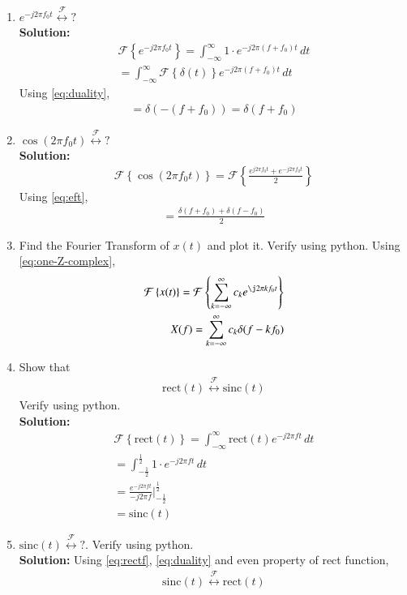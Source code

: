\documentclass[journal,12pt,twocolumn]{IEEEtran}
\newcommand{\solution}{\noindent \textbf{Solution: }}
\providecommand{\brak}[1]{\ensuremath{\left(#1\right)}}
\providecommand{\rect}[1]{\text{rect}\ensuremath{\left(#1\right)}}
\providecommand{\cbrak}[1]{\ensuremath{\left\{#1\right\}}}
\providecommand{\foutranin}[1]{\mathcal{F}\cbrak{#1}}
\providecommand{\foutranfin}[1]{\int_{-\infty}^{\infty}{#1}e^{-j2\pi ft}\,dt}
\providecommand{\sinc}[1]{\text{sinc}\ensuremath{\left(#1\right)}}
\providecommand{\system}[1]{\overset{\mathcal{#1}}{ \longleftrightarrow}}
\numberwithin{equation}{section}
\renewcommand\thesection{\arabic{section}}
\begin{document}
\begin{enumerate}[label=\thesection.\arabic*
,ref=\thesection.\theenumi]
\begin{align}
 \end{align}
 Since $e^{-j2\pi ft}=1$ for t=0 and remaining integrand is zero for t $\neq0$.
 \begin{align}
  =\int_{-\infty}^{\infty}\delta(t)\,dt\\
  =1
 \end{align}
 \item $e^{-j2\pi f_0t}\system{F}?$\\
 \solution 
 \begin{align}
 \foutranin{e^{-j2\pi f_0t}}=\int_{-\infty}^{\infty}1\cdot e^{-j2\pi\brak{f+f_0}t}\,dt\\
 =\int_{-\infty}^{\infty}\foutranin{\delta(t)} e^{-j2\pi\brak{f+f_0}t}\,dt
 \end{align}
 Using \eqref{eq:duality},
 \begin{align}
 \label{eq:eft}
 =\delta(-(f+f_0))=\delta(f+f_0)
 \end{align}
 \item $\cos(2\pi f_0t)\system{F}?$\\
 \solution
 \begin{align}
 \foutranin{\cos(2\pi f_0t)}=\foutranin{\frac{{e^{j2\pi f_0t}+e^{-j2\pi f_0t}}}{2}}
 \end{align}
 Using \eqref{eq:eft},
 \begin{align}
 =\frac{\delta(f+f_0)+\delta(f-f_0)}{2}
 \end{align}
 \item Find the Fourier Transform of $x(t)$ and plot it.  Verify using python.
 Using \eqref{eq:one-Z-complex},
 \begin{align}
 \foutranin{x(t)}=\foutranin{\sum_{k = -\infty}^{\infty}c_ke^{\j2\pi kf_0 t}}\\
 X(f)=\sum_{k = -\infty}^{\infty}c_k\delta(f-kf_0)
 \end{align}
 \item Show that 
 \begin{align}
	 \rect{t} \system{F} \sinc{t}
 \end{align}
 Verify using python.\\
 \solution 
 \begin{align}
 \foutranin{\rect{t}}=\foutranfin{\rect{t}}\\
 =\int_{-\frac{1}{2}}^{\frac{1}{2}}1\cdot e^{-j2\pi ft}\,dt\\
 =\frac{e^{-j2\pi ft}}{-j2\pi f}\Big |_{-\frac{1}{2}}^{\frac{1}{2}}\\
\label{eq:rectf}
 =\sinc{t}
 \end{align}
 \item 
$	 \sinc{t}\system{F} ?$.  Verify using python.\\
\solution
Using \eqref{eq:rectf}, \eqref{eq:duality} and even property of rect function,
\begin{align}
\label{eq:sinc}
\sinc{t}\system{F}\rect{t}
\end{align}
\end{enumerate}
\end{document}
